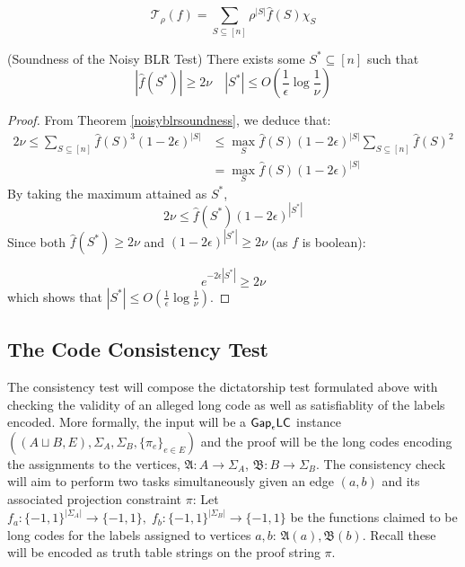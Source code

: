 \begin{equation}
  \mathcal{T}_\rho(f) = \sum_{S \subseteq [n]} \rho^{|S|}\widehat{f}(S)\chi_S
\end{equation}

%
\begin{corollary}
  (Soundness of the Noisy BLR Test) There exists some $S^* \subseteq [n]$ such that
  \begin{equation}
    |\widehat{f}(S^*)| \geq 2\nu \quad |S^*| \leq O\left(\frac{1}{\epsilon}\log{\frac{1}{\nu}}\right)
  \end{equation}
\end{corollary}
%
\begin{proof}
  From Theorem \ref{noisyblrsoundness}, we deduce that:
  \begin{align*}
      2\nu \leq  \sum_{S \subseteq [n]} \widehat{f}(S)^3 (1-2\epsilon)^{|S|} & \leq \max_{S}{\widehat{f}(S)}(1-2\epsilon)^{|S|} \sum_{S \subseteq [n]} \widehat{f}(S)^2 \\
      & = \max_{S}{\widehat{f}(S)}(1-2\epsilon)^{|S|}
  \end{align*}
  By taking the maximum attained as $S^*$,
  \[2\nu \leq \widehat{f}(S^*)(1-2\epsilon)^{|S^*|} \]
  Since both $\widehat{f}(S^*) \geq 2\nu$ and $(1-2\epsilon)^{|S^*|} \geq 2\nu$ (as $f$ is boolean):

  \[e^{-2\epsilon|S^*|} \geq 2\nu \]
  which shows that $|S^*| \leq O\left(\frac{1}{\epsilon}\log{\frac{1}{\nu}}\right)$.
\end{proof}

\subsection{The Code Consistency Test}
The consistency test will compose the dictatorship test formulated above with checking the validity of an alleged long code as well as satisfiablity of the labels encoded. More formally, the input will be a $\mathsf{Gap}_\epsilon\mathsf{LC}$ instance $((A\sqcup B,E),\Sigma_A,\Sigma_B,\{\pi_e\}_{e \in E})$ and the proof will be the long codes encoding the assignments to the vertices, $\mathfrak{A}: A \rightarrow \Sigma_A$, $\mathfrak{B}: B \rightarrow \Sigma_B$. The consistency check will aim to perform two tasks simultaneously given an edge $(a,b)$ and its associated projection constraint $\pi$: Let $f_a:\{-1,1\}^{|\Sigma_A|} \rightarrow \{-1,1\}, \; f_b:\{-1,1\}^{|\Sigma_B|} \rightarrow \{-1,1\}$ be the functions claimed to be long codes for the labels assigned to vertices $a,b$: $\mathfrak{A}(a),\mathfrak{B}(b)$. Recall these will be encoded as truth table strings on the proof string $\pi$.

